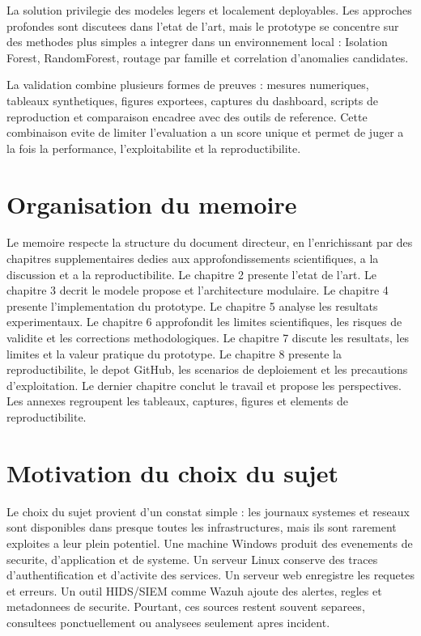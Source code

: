 La solution privilegie des modeles legers et localement deployables. Les approches profondes sont discutees dans l'etat de l'art, mais le prototype se concentre sur des methodes plus simples a integrer dans un environnement local : Isolation Forest, RandomForest, routage par famille et correlation d'anomalies candidates.

La validation combine plusieurs formes de preuves : mesures numeriques, tableaux synthetiques, figures exportees, captures du dashboard, scripts de reproduction et comparaison encadree avec des outils de reference. Cette combinaison evite de limiter l'evaluation a un score unique et permet de juger a la fois la performance, l'exploitabilite et la reproductibilite.

\section{Organisation du memoire}
Le memoire respecte la structure du document directeur, en l'enrichissant par des chapitres supplementaires dedies aux approfondissements scientifiques, a la discussion et a la reproductibilite. Le chapitre 2 presente l'etat de l'art. Le chapitre 3 decrit le modele propose et l'architecture modulaire. Le chapitre 4 presente l'implementation du prototype. Le chapitre 5 analyse les resultats experimentaux. Le chapitre 6 approfondit les limites scientifiques, les risques de validite et les corrections methodologiques. Le chapitre 7 discute les resultats, les limites et la valeur pratique du prototype. Le chapitre 8 presente la reproductibilite, le depot GitHub, les scenarios de deploiement et les precautions d'exploitation. Le dernier chapitre conclut le travail et propose les perspectives. Les annexes regroupent les tableaux, captures, figures et elements de reproductibilite.

\section{Motivation du choix du sujet}
Le choix du sujet provient d'un constat simple : les journaux systemes et reseaux sont disponibles dans presque toutes les infrastructures, mais ils sont rarement exploites a leur plein potentiel. Une machine Windows produit des evenements de securite, d'application et de systeme. Un serveur Linux conserve des traces d'authentification et d'activite des services. Un serveur web enregistre les requetes et erreurs. Un outil HIDS/SIEM comme Wazuh ajoute des alertes, regles et metadonnees de securite. Pourtant, ces sources restent souvent separees, consultees ponctuellement ou analysees seulement apres incident.

